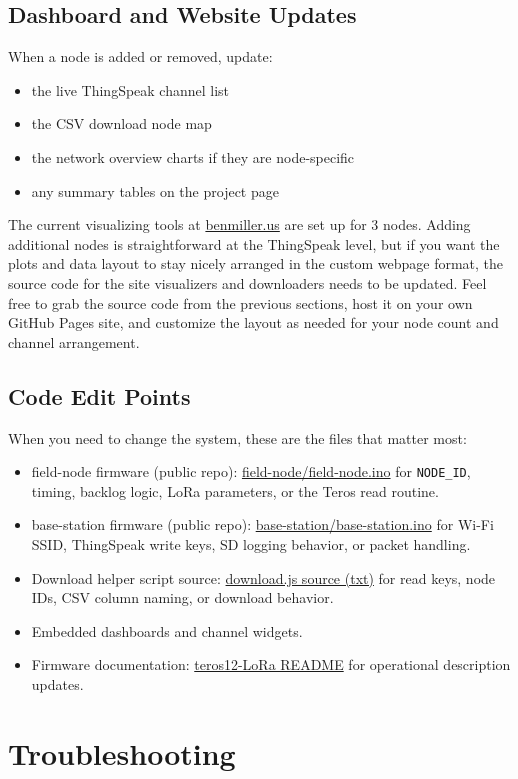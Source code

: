 \documentclass[11pt]{article}
\newcommand{\firmwarereadme}{\href{https://github.com/benjamenm03/teros12-LoRa/blob/main/README.md}{teros12-LoRa README}}
\newcommand{\fieldfirmware}{\href{https://github.com/benjamenm03/teros12-LoRa/blob/main/field-node/field-node.ino}{field-node/field-node.ino}}
\newcommand{\basefirmware}{\href{https://github.com/benjamenm03/teros12-LoRa/blob/main/base-station/base-station.ino}{base-station/base-station.ino}}
\begin{document}
\subsection{Dashboard and Website Updates}
When a node is added or removed, update:
\begin{itemize}
    \item the live ThingSpeak channel list
    \item the CSV download node map
    \item the network overview charts if they are node-specific
    \item any summary tables on the project page
\end{itemize}

The current visualizing tools at \href{https://benmiller.us}{benmiller.us} are set up for 3 nodes. Adding additional nodes is straightforward at the ThingSpeak level, but if you want the plots and data layout to stay nicely arranged in the custom webpage format, the source code for the site visualizers and downloaders needs to be updated. Feel free to grab the source code from the previous sections, host it on your own GitHub Pages site, and customize the layout as needed for your node count and channel arrangement.

\subsection{Code Edit Points}
When you need to change the system, these are the files that matter most:
\begin{itemize}
    \item field-node firmware (public repo): \fieldfirmware{} for \texttt{NODE\_ID}, timing, backlog logic, LoRa parameters, or the Teros read routine.
    \item base-station firmware (public repo): \basefirmware{} for Wi-Fi SSID, ThingSpeak write keys, SD logging behavior, or packet handling.
    \item Download helper script source: \href{https://benmiller.us/assets/download-source.txt}{download.js source (txt)} for read keys, node IDs, CSV column naming, or download behavior.
    \item Embedded dashboards and channel widgets.
    \item Firmware documentation: \firmwarereadme{} for operational description updates.
\end{itemize}

\section{Troubleshooting}
\end{document}

